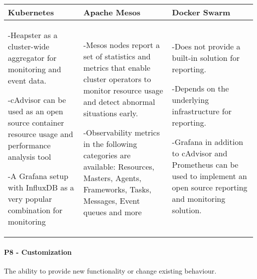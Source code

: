 \begin{center}
  \begin{tabular}{ | p{4.5cm} | p{4.5cm} | p{4.5cm} | }
    \hline
    \textbf{Kubernetes}&\textbf{Apache Mesos}&\textbf{Docker Swarm}\\\hline
    -Heapster as a cluster-wide aggregator for monitoring and event data.
    
    -cAdvisor can be used as an open source container resource usage and
    performance analysis tool
    
    -A Grafana setup with InfluxDB as a very popular combination for monitoring&
    
    -Mesos nodes report a set of statistics and metrics that
    enable cluster operators to monitor resource usage and detect abnormal
    situations early.
    
    -Observability metrics in the following categories are available:
    Resources, Masters, Agents, Frameworks, Tasks, Messages, Event queues
    and more&
    
    -Does not provide a built-in solution for reporting.
    
    -Depends on the underlying infrastructure for reporting.
    
    -Grafana in addition to cAdvisor and Prometheus can be used to implement an
    open source reporting and monitoring solution.\\
    \hline
  \end{tabular}
\end{center}

\paragraph{P8 - Customization}

The ability to provide new functionality or change existing behaviour. 

